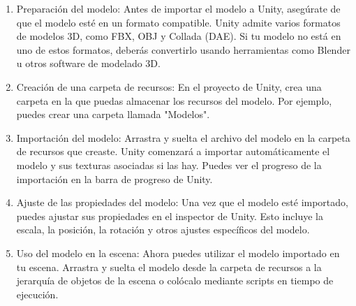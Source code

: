 \begin{enumerate}
	\item Preparación del modelo: Antes de importar el modelo a Unity, asegúrate de que el modelo esté en un formato compatible. Unity admite varios formatos de modelos 3D, como FBX, OBJ y Collada (DAE). Si tu modelo no está en uno de estos formatos, deberás convertirlo usando herramientas como Blender u otros software de modelado 3D.
	
	\item Creación de una carpeta de recursos: En el proyecto de Unity, crea una carpeta en la que puedas almacenar los recursos del modelo. Por ejemplo, puedes crear una carpeta llamada "Modelos".
	
	\item Importación del modelo: Arrastra y suelta el archivo del modelo en la carpeta de recursos que creaste. Unity comenzará a importar automáticamente el modelo y sus texturas asociadas si las hay. Puedes ver el progreso de la importación en la barra de progreso de Unity.
	
	\item Ajuste de las propiedades del modelo: Una vez que el modelo esté importado, puedes ajustar sus propiedades en el inspector de Unity. Esto incluye la escala, la posición, la rotación y otros ajustes específicos del modelo.
	
	\item Uso del modelo en la escena: Ahora puedes utilizar el modelo importado en tu escena. Arrastra y suelta el modelo desde la carpeta de recursos a la jerarquía de objetos de la escena o colócalo mediante scripts en tiempo de ejecución.
\end{enumerate}